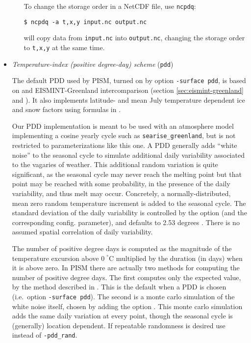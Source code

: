 \begin{itemize}
\begin{itemize}
To change the storage order in a NetCDF file, use \texttt{ncpdq}:
\begin{verbatim}
$ ncpdq -a t,x,y input.nc output.nc
\end{verbatim}%
will copy data from \texttt{input.nc} into \texttt{output.nc}, changing the storage order to \texttt{t,x,y} at the same time.
\end{itemize}

 \item \emph{Temperature-index (positive degree-day) scheme} (\texttt{pdd})     

   The default PDD used by PISM, turned on by option \texttt{-surface pdd}, is based on \cite{CalovGreve05} and EISMINT-Greenland intercomparison (section \ref{sec:eismint-greenland} and \cite{RitzEISMINT}).  It also implements latitude- and mean July temperature dependent ice and snow factors using formulas in \cite{Faustoetal2009}.

   Our PDD implementation is meant to be used with an atmosphere model implementing a cosine yearly cycle such as \texttt{searise_greenland}, but is not restricted to parameterizations like this one. A PDD generally adds ``white noise'' to the seasonal cycle to simulate additional daily variability associated to the vagaries of weather.  This additional random variation is quite significant, as the seasonal cycle may never reach the melting point but that point may be reached with some probability, in the presence of the daily variability, and thus melt may occur.  Concretely, a normally-distributed, mean zero random temperature increment is added to the seasonal cycle.  The standard deviation of the daily variability is controlled by the  option (and the corresponding config. parameter), and defaults to 2.53 degrees \cite{Faustoetal2009}. There is no assumed spatial correlation of daily variability.

The number of positive degree days is computed as the magnitude of the temperature excursion above $0\!\phantom{|}^\circ \text{C}$ multiplied by the duration (in days) when it is above zero.  In PISM there are actually two methods for computing the number of positive degree days.  The first computes only the expected value, by the method described in \cite{CalovGreve05}.  This is the default when a PDD is chosen (i.e.~option \texttt{-surface pdd}).  The second is a monte carlo simulation of the white noise itself, chosen by adding the option .  This monte carlo simulation adds the same daily variation at every point, though the seasonal cycle is (generally) location dependent.  If repeatable randomness is desired use  instead of \texttt{-pdd_rand}.


\end{itemize}
